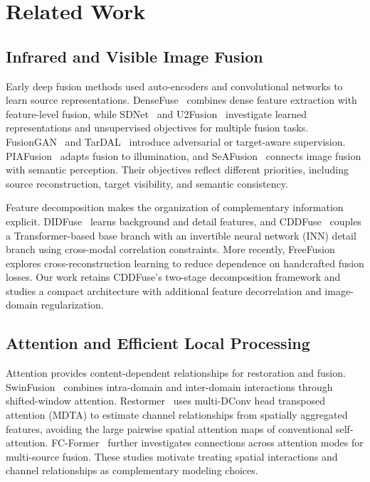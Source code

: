 \section{Related Work}\label{sec:related}

\subsection{Infrared and Visible Image Fusion}
Early deep fusion methods used auto-encoders and convolutional networks to learn source representations. DenseFuse~\cite{li2019densefuse} combines dense feature extraction with feature-level fusion, while SDNet~\cite{zhang2021sdnet} and U2Fusion~\cite{xu2022u2fusion} investigate learned representations and unsupervised objectives for multiple fusion tasks. FusionGAN~\cite{ma2019fusiongan} and TarDAL~\cite{liu2022tardal} introduce adversarial or target-aware supervision. PIAFusion~\cite{tang2022piafusion} adapts fusion to illumination, and SeAFusion~\cite{tang2022seafusion} connects image fusion with semantic perception. Their objectives reflect different priorities, including source reconstruction, target visibility, and semantic consistency.

Feature decomposition makes the organization of complementary information explicit. DIDFuse~\cite{zhao2020didfuse} learns background and detail features, and CDDFuse~\cite{zhao2023cddfuse} couples a Transformer-based base branch with an invertible neural network (INN) detail branch using cross-modal correlation constraints. More recently, FreeFusion~\cite{zhao2025freefusion} explores cross-reconstruction learning to reduce dependence on handcrafted fusion losses. Our work retains CDDFuse's two-stage decomposition framework and studies a compact architecture with additional feature decorrelation and image-domain regularization.

\subsection{Attention and Efficient Local Processing}
Attention provides content-dependent relationships for restoration and fusion. SwinFusion~\cite{ma2022swinfusion} combines intra-domain and inter-domain interactions through shifted-window attention. Restormer~\cite{zamir2022restormer} uses multi-DConv head transposed attention (MDTA) to estimate channel relationships from spatially aggregated features, avoiding the large pairwise spatial attention maps of conventional self-attention. FC-Former~\cite{wu2025fcformer} further investigates connections across attention modes for multi-source fusion. These studies motivate treating spatial interactions and channel relationships as complementary modeling choices.

